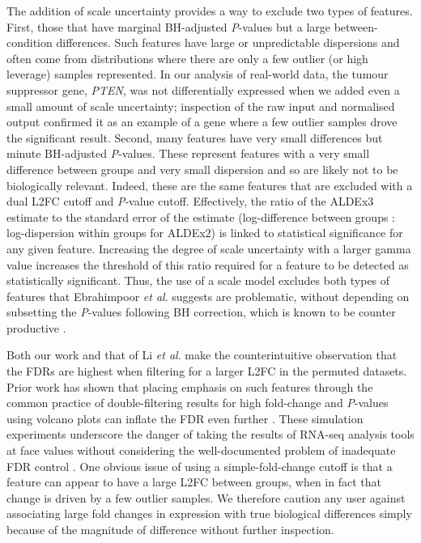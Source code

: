 \documentclass[10pt,letterpaper]{article}
\begin{document}
The addition of scale uncertainty provides a way to exclude two types of features. First, those that have marginal BH-adjusted \textit{P}-values but a large between-condition differences. Such features have large or unpredictable dispersions and often come from distributions where there are only a few outlier (or high leverage) samples represented. In our analysis of real-world data, the tumour suppressor gene, \textit{PTEN}, was not differentially expressed when we added even a small amount of scale uncertainty; inspection of the raw input and normalised output confirmed it as an example of a gene where a few outlier samples drove the significant result. Second, many features have very small differences but minute BH-adjusted \textit{P}-values. These represent features with a very small difference between groups and very small dispersion and so are likely not to be biologically relevant. Indeed, these are the same features that are excluded with a dual L2FC cutoff and \textit{P}-value cutoff. Effectively, the ratio of the ALDEx3 estimate to the standard error of the estimate (log-difference between groups : log-dispersion within groups for ALDEx2) is linked to statistical significance for any given feature. Increasing the degree of scale uncertainty with a larger gamma value increases the threshold of this ratio required for a feature to be detected as statistically significant. Thus, the use of a scale model excludes both types of features that Ebrahimpoor \textit{et al}. \cite{ebrahimpoor_inflated_2021} suggests are problematic, without depending on subsetting the \textit{P}-values following BH correction, which is known to be counter productive \cite{Goeman:2014aa, ebrahimpoor_inflated_2021}.

Both our work and that of Li \textit{et al}. make the counterintuitive observation that the FDRs are highest when filtering for a larger L2FC in the permuted datasets. Prior work has shown that placing emphasis on such features through the common practice of double-filtering results for high fold-change and \textit{P}-values using volcano plots can inflate the FDR even further \cite{Cui:2003aa, bourgon_independent_2010}. These simulation experiments underscore the danger of taking the results of RNA-seq analysis tools at face values without considering the well-documented problem of inadequate FDR control \cite{witten2007comparison, Zhang:2009aa}. One obvious issue of using a simple-fold-change cutoff is that a feature can appear to have a large L2FC between groups, when in fact that change is driven by a few outlier samples. We therefore caution any user against associating large fold changes in expression with true biological differences simply because of the magnitude of difference without further inspection.
\end{document}
